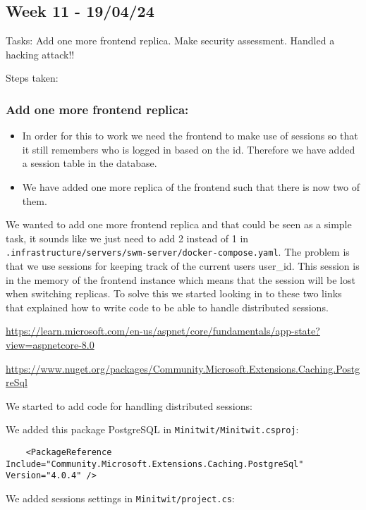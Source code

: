 \subsection{Week 11 - 19/04/24}
\label{log:week11}

Tasks: Add one more frontend replica. Make security assessment. Handled
a hacking attack!!

Steps taken:

\subsubsection{Add one more frontend replica:}
\label{log:add-one-more-frontend-replica}

\begin{itemize}
    \item In order for this to work we need the frontend to make use of sessions so that it still remembers who is logged in based on the id. Therefore we have added a session table in the database.
    \item We have added one more replica of the frontend such that there is now two of them.
\end{itemize}

We wanted to add one more frontend replica and that could be seen as a simple task, it sounds like we just need to add 2 instead of 1 in \texttt{.infrastructure/servers/swm-server/docker-compose.yaml}. The problem is that we use sessions for keeping track of the current users user\_id. This session is in the memory of the frontend instance which means that the session will be lost when switching replicas. To solve this we started looking in to these two links that explained how to write code to be able to handle distributed sessions.

\url{https://learn.microsoft.com/en-us/aspnet/core/fundamentals/app-state?view=aspnetcore-8.0}

\url{https://www.nuget.org/packages/Community.Microsoft.Extensions.Caching.PostgreSql}

We started to add code for handling distributed sessions:

We added this package PostgreSQL in \texttt{Minitwit/Minitwit.csproj}:

\begin{verbatim}
    <PackageReference Include="Community.Microsoft.Extensions.Caching.PostgreSql" Version="4.0.4" />
\end{verbatim}

We added sessions settings in \texttt{Minitwit/project.cs}:

